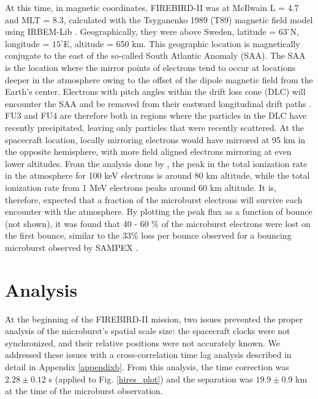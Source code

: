 At this time, in magnetic coordinates, FIREBIRD-II was at McIlwain L = 4.7 and MLT = 8.3, calculated with the Tsyganenko 1989 (T89) magnetic field model \citep{Tsyganenko1989} using IRBEM-Lib \citep{irbem}. Geographically, they were above Sweden, latitude = $63^{\circ}$N, longitude = $15^{\circ}$E, altitude = 650 km. This geographic location is magnetically conjugate to the east of the so-called South Atlantic Anomaly (SAA). The SAA is the location where the mirror points of electrons tend to occur at locations deeper in the atmosphere owing to the offset of the dipole magnetic field from the Earth's center. Electrons with pitch angles within the drift loss cone (DLC) will encounter the SAA and be removed from their eastward longitudinal drift paths \citep{Comess2013, Dietrich2010}. FU3 and FU4 are therefore both in regions where the particles in the DLC have recently precipitated, leaving only particles that were recently scattered. At the spacecraft location, locally mirroring electrons would have mirrored at 95 km in the opposite hemisphere, with more field aligned electrons mirroring at even lower altitudes. From the analysis done by \citet{Fang2010}, the peak in the total ionization rate in the atmosphere for 100 keV electrons is around 80 km altitude, while the total ionization rate from 1 MeV electrons peaks around 60 km altitude. It is, therefore, expected that a fraction of the microburst electrons will survive each encounter with the atmosphere. By plotting the peak flux as a function of bounce (not shown), it was found that 40 - 60 \% of the microburst electrons were lost on the first bounce, similar to the 33\% loss per bounce observed for a bouncing microburst observed by SAMPEX \citep{Thorne2005}.

\section{Analysis} \label{analysis} %
At the beginning of the FIREBIRD-II mission, two issues prevented the proper analysis of the microburst's spatial scale size: the spacecraft clocks were not synchronized, and their relative positions were not accurately known. We addressed these issues with a cross-correlation time lag analysis described in detail in Appendix \ref{appendixb}. From this analysis, the time correction was $2.28 \pm 0.12$ s (applied to Fig. \ref{hires_plot}) and the separation was $19.9 \pm 0.9$ km at the time of the microburst observation.

